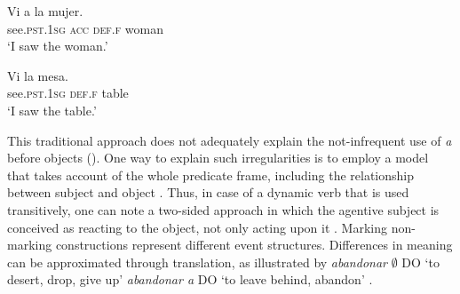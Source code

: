\documentclass[output=paper]{LSP/langsci}
\begin{document}
\begin{exe}
\ex 
\begin{xlist}
\ex \label{06-en:ex:16a}
\gll Vi 				a 		la 		mujer. \\
	see.\textsc{pst.1sg} \textsc{acc} \textsc{def.f} woman\\
\glt ‘I saw the woman.’

\ex\label{06-en:ex:16b}
\gll Vi 				la 		mesa. \\
	see.\textsc{pst.1sg} \textsc{def.f} table \\
\glt ‘I saw the table.’ \citep[41]{vonHeusingeretal2003Interaction}

\end{xlist}
\end{exe}

This traditional approach does not adequately explain the not-infrequent use of \textit{a} before  objects (\cf \citealt[51]{vonHeusingeretal2003Interaction}). One way to explain such irregularities is to employ a model that takes account of the whole predicate frame, including the relationship between subject and object \citep{Delbecque2002Construction,Garcia2007Inanimate}. Thus, in case of a dynamic verb that is used transitively, one can note a two-sided approach in which the agentive subject is conceived as reacting to the object, not only acting upon it \citep[103]{Delbecque2002Construction}. Marking \vs non-marking constructions represent different event structures. Differences in meaning can be approximated through translation, as illustrated by \textit{abandonar} ${\emptyset}$ DO ‘to desert, drop, give up’ \vs \textit{abandonar a} DO ‘to leave behind, abandon’ \citep[93]{Delbecque2002Construction}. 
\end{document}
